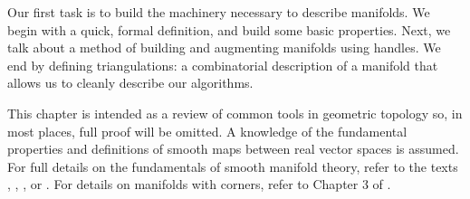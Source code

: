 Our first task is to build the machinery necessary to describe manifolds.
We begin with a quick, formal definition, and build some basic properties.
Next, we talk about a method of building and augmenting manifolds using handles.
We end by defining triangulations: a combinatorial description of a manifold that allows us to cleanly describe our algorithms.

This chapter is intended as a review of common tools in geometric topology so, in most places, full proof will be omitted.
A knowledge of the fundamental properties and definitions of smooth maps between real vector spaces is assumed.
For full details on the fundamentals of smooth manifold theory, refer to the texts \cite{GompStip}, \cite{Hirsch67}, \cite{Kosi93}, or \cite{Lee00}.
For details on manifolds with corners, refer to Chapter 3 of \cite{JSP}.